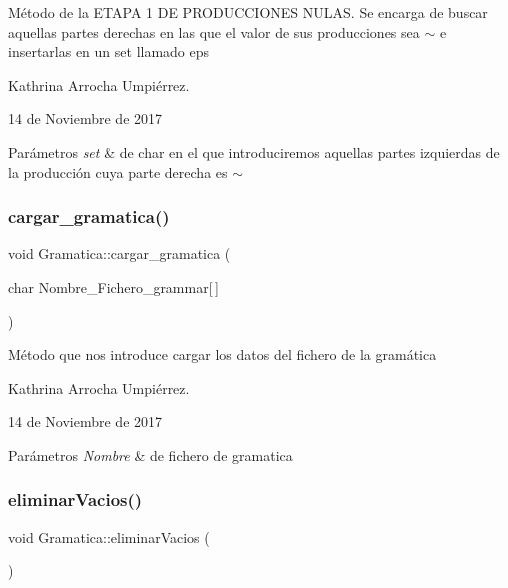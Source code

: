 Método de la E\+T\+A\+PA 1 DE P\+R\+O\+D\+U\+C\+C\+I\+O\+N\+ES N\+U\+L\+AS. Se encarga de buscar aquellas partes derechas en las que el valor de sus producciones sea $\sim$ e insertarlas en un set llamado eps

Kathrina Arrocha Umpiérrez.

14 de Noviembre de 2017 
\begin{DoxyParams}{Parámetros}
{\em set} & de char en el que introduciremos aquellas partes izquierdas de la producción cuya parte derecha es $\sim$ \\
\hline
\end{DoxyParams}
\mbox{\label{class_gramatica_ac63eb5aa47382764880dc1c72680ce48}} 
\subsubsection{\texorpdfstring{cargar\+\_\+gramatica()}{cargar\_gramatica()}}
{\footnotesize\ttfamily void Gramatica\+::cargar\+\_\+gramatica (\begin{DoxyParamCaption}\item[{char}]{Nombre\+\_\+\+Fichero\+\_\+grammar\mbox{[}$\,$\mbox{]} }\end{DoxyParamCaption})}

Método que nos introduce cargar los datos del fichero de la gramática

Kathrina Arrocha Umpiérrez.

14 de Noviembre de 2017 
\begin{DoxyParams}{Parámetros}
{\em Nombre} & de fichero de gramatica \\
\hline
\end{DoxyParams}
\mbox{\label{class_gramatica_ab457a99cd09de77d53952a6627d79c18}} 
\subsubsection{\texorpdfstring{eliminar\+Vacios()}{eliminarVacios()}}
{\footnotesize\ttfamily void Gramatica\+::eliminar\+Vacios (\begin{DoxyParamCaption}{ }\end{DoxyParamCaption})}

